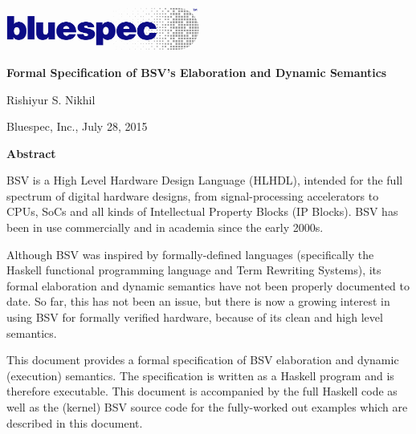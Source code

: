 \documentclass[11pt]{article}
\newcommand{\hm}{\hspace*{1em}}
\newlength{\hlessmm}
\begin{document}

\begin{center}

\centerline{\includegraphics[width=2.5in,angle=0]{Figures/Fig_Logo_2color_on_white}}

\vspace{2ex}

{\Large\bf Formal Specification of BSV's Elaboration and Dynamic Semantics}

\vspace{1ex}

Rishiyur S. Nikhil

\vspace{1ex}

Bluespec, Inc., July 28, 2015

\end{center}


\begin{center}
\begin{minipage}{\hlessmm}
\begin{center}
\bf Abstract
\end{center}

BSV is a High Level Hardware Design Language (HLHDL), intended for the
full spectrum of digital hardware designs, from signal-processing
accelerators to CPUs, SoCs and all kinds of Intellectual Property
Blocks (IP Blocks).  BSV has been in use commercially and in academia
since the early 2000s.

\hm Although BSV was inspired by formally-defined languages
(specifically the Haskell functional programming language and Term
Rewriting Systems), its formal elaboration and dynamic semantics have
not been properly documented to date.  So far, this has not been an
issue, but there is now a growing interest in using BSV for formally
verified hardware, because of its clean and high level semantics.

\hm This document provides a formal specification of BSV elaboration
and dynamic (execution) semantics. The specification is written as a
Haskell program and is therefore executable.  This document is
accompanied by the full Haskell code as well as the (kernel) BSV
source code for the fully-worked out examples which are described in
this document.

\end{minipage}
\end{center}
\end{document}

